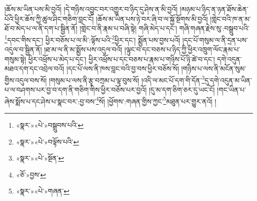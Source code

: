 །ཆོས་མ་ཡིན་པས་མི་བྱའོ། །དེ་གཉིས་འབྱུང་བར་འགྱུར་བ་ཉིད་དུ་ཤེས་ན་མི་བྱའོ། །མཉམ་པ་ཉིད་ན་ཉན་ཐོས་ཆེན་པོའི་ཕྱིར་ཆོས་ཀྱི་ཚུལ་ཤིང་གཅིག་བླང་ངོ། །ཆོས་མ་ཡིན་པས་ཉེ་བར་ཞི་བ་ལ་སྐྱོ་སྔོགས་མི་བྱའོ། །གླེང་བའི་ཁ་ན་མ་ཐོ་བ་མེད་པ་ལ་ནི་དག་པ་སྦྱིན་ནོ། །གླེང་བ་ནི་རྣམ་པ་བཞི་སྟེ། གཞི་མེད་པ་དང་། གཞི་གཞན་རྗེས་སུ་:བསྒྲུབ་པའི་\footnote{«སྣར་»«པེ་»བསྒྲུབས་པའི་}དབང་གིས་དང་། ཕྱིར་བཅོས་པ་ལ་མི་:ལྟོས་པའི་\footnote{«སྣར་»«པེ་»བལྟོས་པའི་}ཕྱིར་དང་། སྨྱོན་པས་བྱས་པའོ། །དང་པོ་གསུམ་ལ་ནི་དྲན་པས་འདུལ་བ་སྦྱིན་ནོ། །ཐ་མ་ལ་ནི་མ་སྨྱོས་པས་འདུལ་བའོ། །ལྟུང་བ་དང་བཅས་པ་ཉིད་ཀྱི་ཕྱིར་འཁྲུག་ལོང་རྣམ་པ་གསུམ་སྟེ། ཕྱིར་འཕྲོས་པ་མེད་པ་དང་། ཕྱིར་འཕྲོས་པ་དང་བཅས་པ་རྣམ་པ་གཉིས་པོ་ཉི་ཚེ་བ་དང་། དགེ་འདུན་མཐའ་དག་དང་འབྲེལ་བའོ། །དང་པོ་ལས་ནི་ཁས་བླང་བའི་བྱ་བས་ཕྱིར་བཅོས་སོ། །གཉིས་པ་ལས་ནི་མངོན་སུམ་གྱིས་འདུལ་བས་སོ། །གསུམ་པ་ལས་ནི་རྩྭ་བཀྲམ་པ་ལྟ་བུས་སོ། །འདི་ལ་མང་པོ་དག་གི་དོན་\footnote{«སྣར་»«པེ་»སྔོན་}དུ་དགེ་འདུན་མ་ཡིན་པ་ལ་བཤགས་པར་བྱ་བ་དག་ནི་གཅིག་གིས་ཕྱིར་བཅོས་པར་བྱའོ། །དུ་མ་དག་ཅིག་ཅར་དུ་ཡང་ངོ། །གང་ཡིན་པ་ཞེས་སྨོས་པ་དང་ཤེས་པ་སྣང་བར་:བྱ་བས་\footnote{«ཅོ་»བྱས་}སོ། །ཕྱོགས་:གཞན་གྱིས་ཀྱང་\footnote{«སྣར་»«པེ་»གཞན་}མཐུན་པར་གྱུར་ནའོ། །
